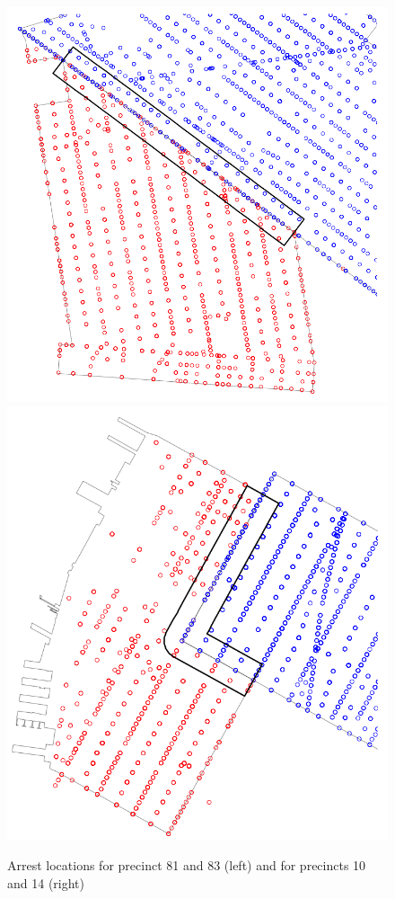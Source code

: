 \documentclass[a4paper,11pt]{article}
\begin{document}
\begin{figure}[h]
    \centering
    \includegraphics[scale=0.20]{plots/Buff81and83.png}
    \includegraphics[scale=0.20]{plots/Buff10and14.png}
        \caption{Arrest locations for precinct 81 and 83 (left) and for precincts 10 and 14 (right)}
    \label{fig:Precinct77_79}
\end{figure}
\end{document}
